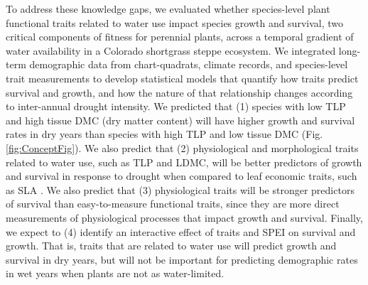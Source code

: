 \documentclass[12pt, letterpaper]{article}
\begin{document}
To address these knowledge gaps, we evaluated whether species-level plant functional traits related to water use impact species growth and survival, two critical components of fitness for perennial plants, across a temporal gradient of water availability in a Colorado shortgrass steppe ecosystem. We integrated long-term demographic data from chart-quadrats, climate records, and species-level trait measurements to develop statistical models that quantify how traits predict survival and growth, and how the nature of that relationship changes according to inter-annual drought intensity. We predicted that (1) species with low TLP and high tissue DMC (dry matter content) will have higher growth and survival rates in dry years than species with high TLP and low tissue DMC (Fig. \ref{fig:ConceptFig}). We also predict that (2) physiological and morphological traits related to water use, such as TLP and LDMC, will be better predictors of growth and survival in response to drought when compared to leaf economic traits, such as SLA \citep{Wright2004, Reich2014}. We also predict that (3) physiological traits will be stronger predictors of survival than easy-to-measure functional traits, since they are more direct measurements of physiological processes that impact growth and survival. Finally, we expect to (4) identify an interactive effect of traits and SPEI on survival and growth. That is, traits that are related to water use will predict growth and survival in dry years, but will not be important for predicting demographic rates in wet years when plants are not as water-limited. 
\end{document}
